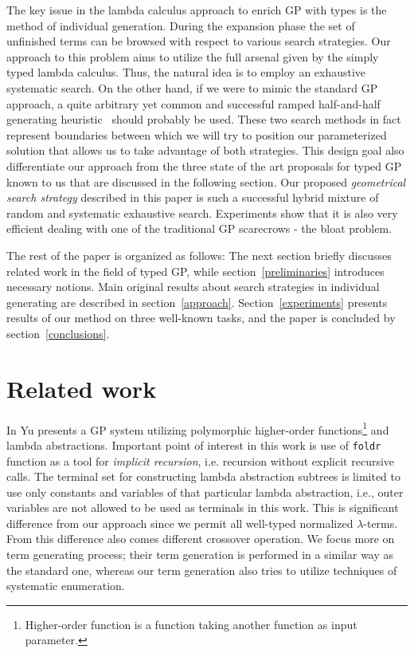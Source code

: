 \documentclass[conference]{IEEEtran}
\newcommand{\lterms}{$\lambda$-terms\xspace}
\begin{document}
The key issue in the lambda calculus approach to enrich GP with types is the method of individual generation. During the expansion phase the set of unfinished terms can be browsed with respect to various search strategies. Our approach to this problem aims to utilize the full arsenal given by the simply typed lambda calculus. Thus, the natural idea is to employ an exhaustive systematic search. On the other hand, if we were to mimic the standard GP approach, a quite arbitrary yet common and successful ramped half-and-half generating heuristic~\cite{fg} should probably be used.  
These two search methods in fact represent boundaries between which we will try to position our parameterized solution that allows us to take advantage of both strategies. This design goal also differentiate our approach from 
the three state of the art proposals for typed GP known to us that are discussed in the following section. 
Our proposed \emph{geometrical search strategy} described in this paper is such a successful hybrid mixture of random and systematic exhaustive search. Experiments show that it is also very efficient dealing with one of the traditional GP scarecrows - the bloat problem.

The rest of the paper is organized as follows: The next section briefly discusses related work in the field of typed GP, while section~\ref{preliminaries} introduces necessary notions. Main original results about search strategies in individual generating are described in section~\ref{approach}. Section~\ref{experiments} presents results of our method on three well-known tasks, and the paper is concluded by section~\ref{conclusions}.

\section{Related work}
\label{related}

In \cite{yu01} Yu presents a GP system utilizing
polymorphic higher-order functions\footnote{Higher-order 
function is a function taking another function as 
input parameter.} and lambda abstractions.
Important point of interest in this work is use of
\texttt{foldr} function as a tool for \textit{implicit recursion},
i.e. recursion without explicit recursive calls. 
The terminal set for constructing lambda abstraction subtrees 
is limited to use only constants and variables of that particular
lambda abstraction, i.e., outer variables are not allowed to be used
as terminals in this work. This is significant difference from our approach 
since we permit all well-typed normalized \lterms. From this difference also
comes different crossover operation. We focus more on term generating process; 
their term generation is performed in a similar way as the standard one, 
whereas our term generation also tries to utilize techniques of systematic enumeration. 
\end{document}
